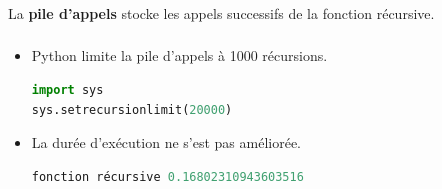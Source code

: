 \documentclass[svgnames,11pt]{beamer}
\begin{document}
\begin{frame}
    \frametitle{}

    \begin{aretenir}[]
        La \textbf{pile d'appels} stocke les appels successifs de la fonction récursive.
        \end{aretenir}

\end{frame}
\begin{frame}[fragile]
    \frametitle{}

    \begin{aretenir}[Remarques]
    \begin{itemize}
        \item<1-> Python limite la pile d'appels à 1000 récursions.
\begin{center}
\begin{lstlisting}[language=Python , basicstyle=\ttfamily\small, xleftmargin=2em, xrightmargin=2em]
import sys
sys.setrecursionlimit(20000)
\end{lstlisting}
\label{CODE}
\end{center}
        \item<2-> La durée d'exécution ne s'est pas améliorée.
\begin{center}
\begin{lstlisting}[language=Python , basicstyle=\ttfamily\small, xleftmargin=2em, xrightmargin=2em]
fonction récursive 0.16802310943603516
\end{lstlisting}
\end{center}
    \end{itemize}
    \end{aretenir}
\end{frame}
\end{document}
